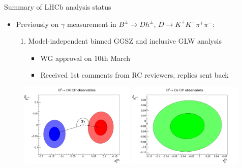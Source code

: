 \documentclass{beamer}
\begin{document}
\begin{frame}{Summary of LHCb analysis status}
  \begin{itemize}
    \setlength\itemsep{0.5em}
    \item{Previously on $\gamma$ measurement in $B^\pm\to Dh^\pm$, $D\to K^+K^-\pi^+\pi^-$:}
    \begin{enumerate}
      \setlength\itemsep{0.5em}
      \item{Model-independent binned GGSZ and inclusive GLW analysis}
      \begin{itemize}
        \item{WG approval on 10th March}
        \item{Received 1st comments from RC reviewers, replies sent back}
      \end{itemize}
    \end{enumerate}
  \end{itemize}
  \begin{figure}
    \includegraphics[width = 0.49\textwidth]{Plots/B2DK_CP_Observables_Contours.png}
    \includegraphics[width = 0.49\textwidth]{Plots/B2Dpi_CP_Observables_Contours.png}
  \end{figure}
\end{frame}
\end{document}
